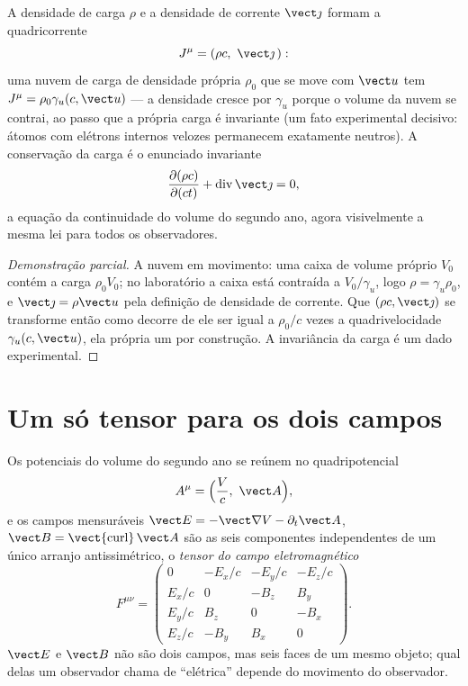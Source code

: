 \begin{proposition}\label{prop:b3:covariant-electromagnetism:fourcurrent}
A densidade de carga $\rho$ e a densidade de corrente $\vect\jmath$
formam a quadricorrente
\[
J^\mu = (\rho c,\ \vect\jmath\,) :
\]
uma nuvem de carga de densidade própria $\rho_0$ que se move com
$\vect u$ tem $J^\mu = \rho_0\gamma_u(c, \vect u)$ --- a densidade
cresce por $\gamma_u$ porque o volume da nuvem se contrai, ao passo que
a própria carga é invariante (um fato experimental decisivo: átomos com
elétrons internos velozes permanecem exatamente neutros). A conservação
da carga é o enunciado invariante
\[
\frac{\partial(\rho c)}{\partial(ct)} +
\operatorname{div}\vect\jmath = 0 ,
\]
a equação da continuidade do volume do segundo ano, agora visivelmente
a mesma lei para todos os observadores.
\end{proposition}

\begin{proof}[Demonstração parcial]
A nuvem em movimento: uma caixa de volume próprio $V_0$ contém a carga
$\rho_0
V_0$; no laboratório a caixa está contraída a $V_0/\gamma_u$, logo $\rho =
\gamma_u\rho_0$, e $\vect\jmath = \rho\vect u$ pela definição
de densidade de corrente. Que $(\rho c, \vect\jmath)$ se transforme
então como  decorre de ele ser igual a $\rho_0/c$ vezes a
quadrivelocidade $\gamma_u(c, \vect u)$, ela própria um  por
construção. A invariância da carga é um dado experimental.
\end{proof}

\section{Um só tensor para os dois campos}

\begin{definition}\label{def:b3:covariant-electromagnetism:tensor}
Os potenciais do volume do segundo ano se reúnem no quadripotencial
\[
A^\mu = \Big(\frac{V}{c},\ \vect A\Big) ,
\]
e os campos mensuráveis $\vect E = -\vect\nabla V -
\partial_t\vect A$, $\vect B = \operatorname{\vect{curl}}\vect A$ são
as seis componentes independentes de um único arranjo antissimétrico, o
\emph{tensor do campo eletromagnético}
\[
F^{\mu\nu} =
\begin{pmatrix}
0 & -E_x/c & -E_y/c & -E_z/c\\
E_x/c & 0 & -B_z & B_y\\
E_y/c & B_z & 0 & -B_x\\
E_z/c & -B_y & B_x & 0
\end{pmatrix} .
\]
$\vect E$ e $\vect B$ não são dois campos, mas seis faces de um mesmo
objeto; qual delas um observador chama de ``elétrica'' depende do
movimento do observador.
\end{definition}

